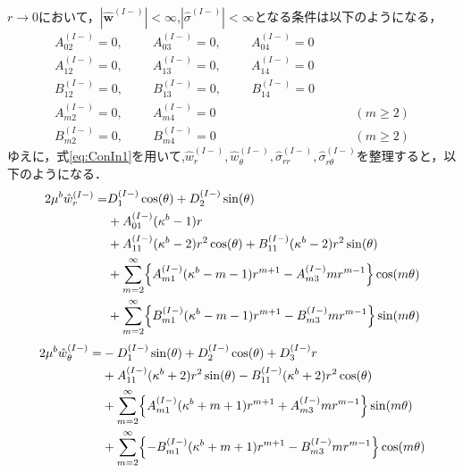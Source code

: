 $r\rightarrow0$において，$|\hat{\bm{w}}^{(I-)}|<\infty$,$|\hat{\sigma}^{(I-)}|<\infty$となる条件は以下のようになる，
\begin{align}
	A_{02}^{(I-)}=0,\hspace{1cm}A_{03}^{(I-)}=0,\hspace{1cm}A_{04}^{(I-)}=0&
	\nonumber
	\\
	A_{12}^{(I-)}=0,\hspace{1cm}A_{13}^{(I-)}=0,\hspace{1cm}A_{14}^{(I-)}=0&
	\nonumber
	\\
	B_{12}^{(I-)}=0,\hspace{1cm}B_{13}^{(I-)}=0,\hspace{1cm}B_{14}^{(I-)}=0&
	\nonumber
	\\
	A_{m2}^{(I-)}=0,\hspace{1cm}A_{m4}^{(I-)}=0&\hspace{1cm}(m\geq2)
	\nonumber
	\\
	B_{m2}^{(I-)}=0,\hspace{1cm}B_{m4}^{(I-)}=0&\hspace{1cm}(m\geq2)
	\label{eq:ConIn1}
\end{align}
ゆえに，式\eqref{eq:ConIn1}を用いて,$\hat{w}_{r}^{(I-)},\hat{w}_{\theta}^{(I-)},\hat{\sigma}_{rr}^{(I-)},\hat{\sigma}_{r\theta}^{(I-)}$を整理すると，以下のようになる．
\begin{align}
	2\mu^{b}\hat{w}_{r}^{(I-)} =&D_{1}^{(I-)}\cos(\theta)+D_{2}^{(I-)}\sin(\theta)
	\nonumber
	\\
	&+A_{01}^{(I-)}(\kappa^{b}-1)r
	\nonumber
	\\
	&+A_{11}^{(I-)}(\kappa^{b}-2)r^2\cos(\theta)
	+B_{11}^{(I-)}(\kappa^{b}-2)r^2\sin(\theta)
	\nonumber
	\\
	&+\sum_{m=2}^{\infty}\Bigl\{A_{m1}^{(I-)}(\kappa^{b}-m-1)r^{m+1}
	-A_{m3}^{(I-)}mr^{m-1}\Bigr\}\cos(m\theta)
	\nonumber
	\\
	&+\sum_{m=2}^{\infty}\Bigl\{B_{m1}^{(I-)}(\kappa^{b}-m-1)r^{m+1}
	-B_{m3}^{(I-)}mr^{m-1}\Bigr\}\sin(m\theta)
	\label{eq:URIn1}
\end{align}
\begin{align}
	2\mu^{b}\hat{w}_{\theta}^{(I-)} =&-D_{1}^{(I-)}\sin(\theta)+D_{2}^{(I-)}\cos(\theta)+D_{3}^{(I-)}r
	\nonumber
	\\
	&+A_{11}^{(I-)}(\kappa^{b}+2)r^2\sin(\theta)
	-B_{11}^{(I-)}(\kappa^{b}+2)r^2\cos(\theta)
	\nonumber
	\\
	&+\sum_{m=2}^{\infty}\Bigl\{A_{m1}^{(I-)}(\kappa^{b}+m+1)r^{m+1}
	+A_{m3}^{(I-)}mr^{m-1}\Bigr\}\sin(m\theta)
	\nonumber
	\\
	&+\sum_{m=2}^{\infty}\Bigl\{-B_{m1}^{(I-)}(\kappa^{b}+m+1)r^{m+1}
	-B_{m3}^{(I-)}mr^{m-1}\Bigr\}\cos(m\theta)
	\label{eq:UThIn1}
\end{align}
